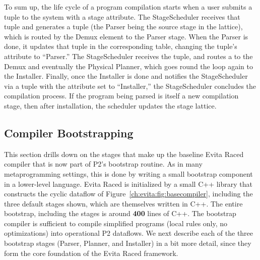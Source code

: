 To sum up, the life cycle of a program compilation starts when a user submits a
 tuple to the system with a  stage attribute.  The
StageScheduler receives that  tuple and generates a
 tuple (the Parser being the source stage in the
lattice), which is routed by the Demux element to the Parser stage.  When the
Parser is done, it updates that  tuple in the corresponding table,
changing the tuple's attribute to ``Parser.'' The StageScheduler receives the
 tuple, and routes a  to the Demux and
eventually the Physical Planner, which goes round the loop again to the
Installer.  Finally, once the Installer is done and notifies the StageScheduler
via a  tuple with the  attribute set to ``Installer,''
the StageScheduler concludes the compilation process.  If the \OVERLOG program
being parsed is itself a new compilation stage, then after installation, the
scheduler updates the stage lattice.


\subsection{Compiler Bootstrapping}
\label{ch:evita:sec:bootstrap}

This section drills down on the stages that make up the baseline Evita Raced
compiler that is now part of P2's bootstrap routine.  As in many
metaprogramming settings, this is done by writing a small bootstrap component
in a lower-level language.  Evita Raced is initialized by a small C++ library
that constructs the cyclic dataflow of Figure~\ref{ch:evita:fig:basecompiler},
including the three default stages shown, which are themselves written in C++.
The entire bootstrap, including the stages is around {\bf 400} lines of C++.
The bootstrap compiler is sufficient to compile simplified \OVERLOG programs
(local rules only, no optimizations) into operational P2 dataflows.  We next
describe each of the three bootstrap stages (Parser, Planner, and Installer) in
a bit more detail, since they form the core foundation of the Evita Raced
framework.

